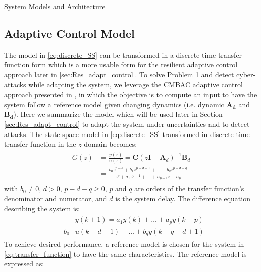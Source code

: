 \begin{section}{System Models and Architecture}
\subsection{Adaptive Control Model}
The model in \eqref{eq:discrete_SS} can be transformed in a discrete-time transfer function form which is a more usable form for the resilient adaptive control approach later in \ref{sec:Res_adapt_control}. To solve Problem 1 and detect cyber-attacks while adapting the system, we leverage the CMBAC adaptive control approach presented in \cite{4106038}, in which the objective is to compute an input to have the system follow a reference model given changing dynamics (i.e. dynamic $\bm{A_d}$ and  $\bm{B_d}$). Here we summarize the model which will be used later in Section \ref{sec:Res_adapt_control} to adapt the system under uncertainties and to detect attacks. The state space model in \eqref{eq:discrete_SS} transformed in discrete-time transfer function in the $z$-domain becomes:
	\begin{align}
	\begin{split}
	\label{eq:transfer_function}
        G(z) & = \frac{y(z)}{u(z)} = \bm{C}(z\bm{I}-\bm{A}_d)^{-1}\bm{B}_d  \\
	& = \frac{b_0z^{p-d}+b_1z^{p-d-1} +...+b_qz^{p-d-q}}{z^{p}+a_1z^{p-1}+...+a_{p-1}z+a_p} 
	\end{split}
	\end{align}
with $b_0\ne{0}$, $d>0$, $p-d-q\geq{0}$, $p$ and $q$ are orders of the transfer function's denominator and numerator, and $d$ is the system delay. The difference equation describing the system is:
    \begin{align}
    \begin{split}
	\label{eq:difference_equation}
	&y(k+1)=a_1y(k)+\dots+a_py(k-p) \\
	+b_0&u(k-d+1)+\dots+b_qy(k-q-d+1)
	\end{split}
	\end{align}
To achieve desired performance, a reference model is chosen for the system in \eqref{eq:transfer_function} to have the same characteristics. The reference model is expressed as:



\end{section}
